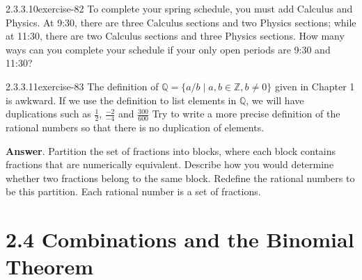 \documentclass[twoside,10pt,]{book}
\numberwithin{equation}{section}
\begin{document}
\begin{divisionsolution}{2.3.3.10}{}{exercise-82}%
\hypertarget{p-768}{}%
To complete your spring schedule, you must add Calculus and Physics. At 9:30, there are three Calculus sections and two Physics sections; while at 11:30, there are two Calculus sections and three Physics sections.  How many ways can you complete your schedule if your only open periods are 9:30 and 11:30?%
\end{divisionsolution}%
\begin{divisionsolution}{2.3.3.11}{}{exercise-83}%
\hypertarget{p-769}{}%
The definition of \(\mathbb{Q}  = \{a/b \mid a, b \in \mathbb{Z}, b \neq 0\}\) given in Chapter 1 is  awkward. If we use the definition to list elements in \(\mathbb{Q}\), we will have duplications such as \(\frac{1}{2}\), \(\frac{-2}{-4}\) and \(\frac{300}{600}\)   Try to write a more precise definition of the rational numbers so that there is no duplication of elements.%
\par\smallskip%
\noindent\textbf{Answer}.\quad%
\hypertarget{p-770}{}%
Partition the set of fractions into blocks, where each block contains fractions that are numerically equivalent. Describe how you would determine whether two fractions belong to the same block. Redefine the rational numbers to be this partition. Each rational number is a set of fractions.%
\end{divisionsolution}%
\section*{2.4 Combinations and the Binomial Theorem}
\end{document}
